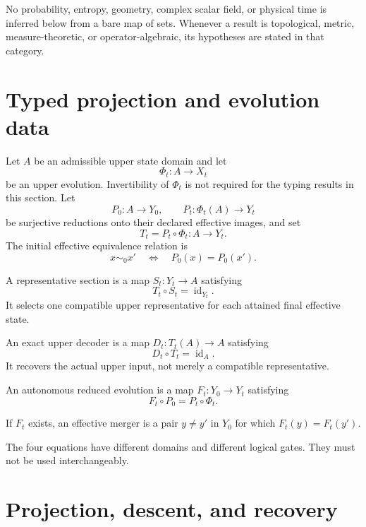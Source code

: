\documentclass[11pt]{article}
\begin{document}
No probability, entropy, geometry, complex scalar field, or physical time is
inferred below from a bare map of sets.  Whenever a result is topological,
metric, measure-theoretic, or operator-algebraic, its hypotheses are stated in
that category.

\section{Typed projection and evolution data}

Let $A$ be an admissible upper state domain and let
\[
  \Phi_t:A\longrightarrow X_t
\]
be an upper evolution.  Invertibility of $\Phi_t$ is not required for the
typing results in this section.  Let
\[
  P_0:A\longrightarrow Y_0,
  \qquad
  P_t:\Phi_t(A)\longrightarrow Y_t
\]
be surjective reductions onto their declared effective images, and set
\[
  T_t=P_t\circ\Phi_t:A\longrightarrow Y_t.
\]
The initial effective equivalence relation is
\[
  x\sim_0x'
  \quad\Longleftrightarrow\quad
  P_0(x)=P_0(x').
\]

\begin{definition}
A representative section is a map $S_t:Y_t\to A$ satisfying
\[
  T_t\circ S_t=\operatorname{id}_{Y_t}.
\]
It selects one compatible upper representative for each attained final
effective state.
\end{definition}

\begin{definition}
An exact upper decoder is a map $D_t:T_t(A)\to A$ satisfying
\[
  D_t\circ T_t=\operatorname{id}_{A}.
\]
It recovers the actual upper input, not merely a compatible representative.
\end{definition}

\begin{definition}
An autonomous reduced evolution is a map $F_t:Y_0\to Y_t$ satisfying
\[
  F_t\circ P_0=P_t\circ\Phi_t.
\]
\end{definition}

\begin{definition}
If $F_t$ exists, an effective merger is a pair $y\ne y'$ in $Y_0$ for which
$F_t(y)=F_t(y')$.
\end{definition}

The four equations have different domains and different logical gates.  They
must not be used interchangeably.

\section{Projection, descent, and recovery}
\end{document}
